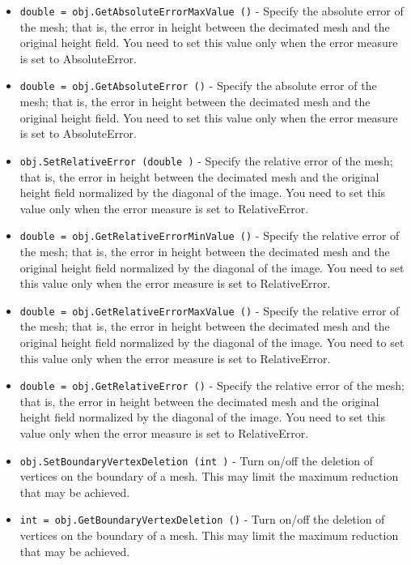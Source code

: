 \begin{itemize}
\item  \verb|double = obj.GetAbsoluteErrorMaxValue ()| -  Specify the absolute error of the mesh; that is, the error in height
 between the decimated mesh and the original height field.  You need to
 set this value only when the error measure is set to AbsoluteError.

\item  \verb|double = obj.GetAbsoluteError ()| -  Specify the absolute error of the mesh; that is, the error in height
 between the decimated mesh and the original height field.  You need to
 set this value only when the error measure is set to AbsoluteError.

\item  \verb|obj.SetRelativeError (double )| -  Specify the relative error of the mesh; that is, the error in height
 between the decimated mesh and the original height field normalized by
 the diagonal of the image.  You need to set this value only when the
 error measure is set to RelativeError.

\item  \verb|double = obj.GetRelativeErrorMinValue ()| -  Specify the relative error of the mesh; that is, the error in height
 between the decimated mesh and the original height field normalized by
 the diagonal of the image.  You need to set this value only when the
 error measure is set to RelativeError.

\item  \verb|double = obj.GetRelativeErrorMaxValue ()| -  Specify the relative error of the mesh; that is, the error in height
 between the decimated mesh and the original height field normalized by
 the diagonal of the image.  You need to set this value only when the
 error measure is set to RelativeError.

\item  \verb|double = obj.GetRelativeError ()| -  Specify the relative error of the mesh; that is, the error in height
 between the decimated mesh and the original height field normalized by
 the diagonal of the image.  You need to set this value only when the
 error measure is set to RelativeError.

\item  \verb|obj.SetBoundaryVertexDeletion (int )| -  Turn on/off the deletion of vertices on the boundary of a mesh. This
 may limit the maximum reduction that may be achieved.

\item  \verb|int = obj.GetBoundaryVertexDeletion ()| -  Turn on/off the deletion of vertices on the boundary of a mesh. This
 may limit the maximum reduction that may be achieved.


\end{itemize}
